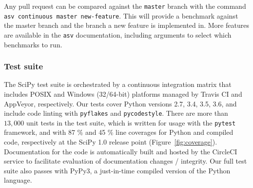 \documentclass[fleqn,10pt]{wlscirep}
\begin{document}
Any pull request can be compared against the \texttt{master} branch with the
command \texttt{asv continuous master new-feature}. This will provide a
benchmark against the master branch and the branch a new feature is implemented
in. More features are available in the \texttt{asv} documentation\cite{asvdocs}, including 
arguments to select which benchmarks to run.

\subsubsection*{Test suite}
\label{sec:testsuite}

The SciPy test suite is orchestrated by a continuous integration matrix that
includes POSIX and Windows (32/64-bit) platforms managed by Travis CI and
AppVeyor, respectively. Our tests cover Python versions 2.7, 3.4, 3.5, 3.6, and
include code linting with \texttt{pyflakes} and \texttt{pycodestyle}. There are more than $13,000$
unit tests in the test suite, which is written for usage with the \texttt{pytest}
framework, and with 87 \% and 45 \% line coverages for Python and compiled
code, respectively at the SciPy 1.0 release point (Figure~\ref{fig:coverage}). Documentation for the code is automatically built and hosted by
the CircleCI service to facilitate evaluation of documentation changes /
integrity.  Our full test suite also passes with PyPy3, a just-in-time compiled
version of the Python language.
\end{document}
